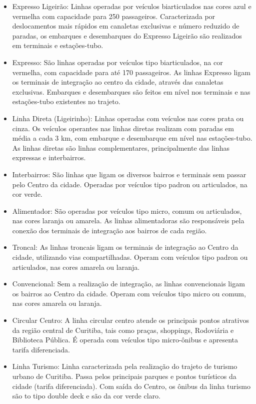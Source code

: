 \begin{itemize}
    \item Expresso Ligeirão: Linhas operadas por veículos biarticulados nas cores azul e vermelha com capacidade para 250 passageiros. Caracterizada por deslocamentos mais rápidos em canaletas exclusivas e número reduzido de paradas, os embarques e desembarques do Expresso Ligeirão são realizados em terminais e estações-tubo. 

    \item Expresso: São linhas operadas por veículos tipo biarticulados, na cor vermelha, com capacidade para até 170 passageiros. As linhas Expresso ligam os terminais de integração ao centro da cidade, através das canaletas exclusivas. Embarques e desembarques são feitos em nível nos terminais e nas estações-tubo existentes no trajeto.

    \item Linha Direta (Ligeirinho): Linhas operadas com veículos nas cores prata ou cinza.  Os veículos operantes nas linhas diretas realizam com paradas em média a cada 3 km, com embarque e desembarque em nível nas estações-tubo. As linhas diretas são linhas complementares, principalmente das linhas expressas e interbairros.

    \item Interbairros: São linhas que ligam os diversos bairros e terminais sem passar pelo Centro da cidade. Operadas por veículos tipo padron ou articulados, na cor verde.
    
    \item Alimentador: São operadas por veículos tipo micro, comum ou articulados, nas cores laranja ou amarela. As linhas alimentadoras são responsáveis pela conexão dos terminais de integração aos bairros de cada região.

    \item Troncal: As linhas troncais ligam os terminais de integração ao Centro da cidade, utilizando vias compartilhadas. Operam com veículos tipo padron ou articulados, nas cores amarela ou laranja. 

    \item Convencional: Sem a realização de integração, as linhas convencionais ligam os bairros ao Centro da cidade. Operam com veículos tipo micro ou comum, nas cores amarela ou laranja.
        
    \item Circular Centro:  A linha circular centro atende os principais pontos atrativos da região central de Curitiba, tais como praças, shoppings, Rodoviária e Biblioteca Pública. É operada com veículos tipo micro-ônibus e apresenta tarifa diferenciada.

    \item Linha Turismo: Linha caracterizada pela realização do trajeto de turismo urbano de Curitiba. Passa pelos principais parques e pontos turísticos da cidade (tarifa diferenciada). Com saída do Centro, os ônibus da linha turismo são to tipo double deck e são da cor verde claro.

\end{itemize}

